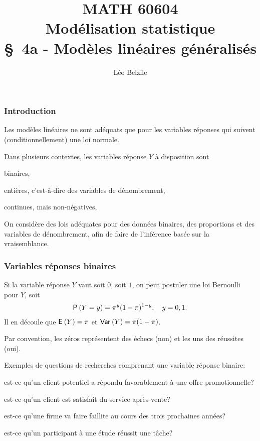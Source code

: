 \documentclass{beamer}
\title[\color{white}{MATH 60604 \S~4a - Modèles linéaires généralisés}]{\texorpdfstring{MATH 60604 \\Modélisation statistique \\ \S~4a - Modèles linéaires généralisés}{MATH 60604 \\Modélisation statistique \\ \S~4a - Modèles linéaires généralisés}}
\author{Léo Belzile}
\institute{HEC Montréal\\
Département de sciences de la décision}
\date{}
\begin{document}
\frame{\titlepage}
\begin{frame}
\frametitle{Introduction}
\bi
\item Les modèles linéaires ne sont adéquats que pour les variables réponses qui suivent (conditionnellement) une loi normale.

\item Dans plusieurs contextes, les variables réponse $Y$ à disposition sont
\bi
\item \alert{binaires}, 
\item entières, c'est-à-dire des variables de \alert{dénombrement}, 
\item \alert{continues, mais non-négatives}, 
\ei
\item On considère des lois adéquates pour des données binaires, des proportions et des variables de dénombrement, afin de faire de l'inférence basée sur la vraisemblance.
\ei
\end{frame}


\begin{frame}
\frametitle{Variables réponses binaires}
\bi
\item Si la variable réponse $Y$ vaut soit $0$, soit $1$, on peut postuler une loi \alert{Bernoulli} pour $Y$, soit
\begin{align*}
\P{Y=y} = \pi^y (1-\pi)^{1-y}, \quad y=0, 1.
\end{align*}
Il en découle que $\E{Y}=\pi$ et $\Va{Y}=\pi(1-\pi)$.
\item Par convention, les zéros représentent des échecs (non) et les uns des réussites (oui).
\item Exemples de questions de recherches comprenant une variable réponse binaire:
\bi
\item est-ce qu'un client potentiel a répondu favorablement à une offre
promotionnelle?
\item est-ce qu'un client est satisfait du service après-vente?
\item est-ce qu'une firme va faire faillite au cours des trois prochaines années?
\item est-ce qu'un participant à une étude réussit une tâche?
\ei
\ei
\end{frame}
\end{document}
